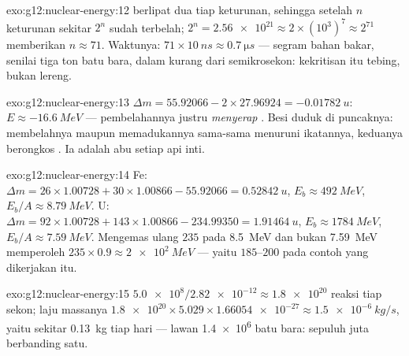 \begin{solution}{exo:g12:nuclear-energy:12}
 berlipat dua tiap keturunan, sehingga setelah $n$ keturunan sekitar $2^n$
sudah terbelah; $2^{n} = \num{2.56e21} \approx 2 \times (10^{3})^{7}
\approx 2^{71}$ memberikan $n \approx 71$. Waktunya: $71 \times \qty{10}{ns}
\approx \qty{0.7}{\micro s}$ --- segram bahan bakar, senilai tiga ton batu bara,
dalam kurang dari semikrosekon: kekritisan itu tebing, bukan lereng.
\end{solution}

\begin{solution}{exo:g12:nuclear-energy:13}
$\Delta m = 55.92066 - 2 \times 27.96924 = \qty{-0.01782}{u}$:
$E \approx \qty{-16.6}{MeV}$ --- pembelahannya justru \emph{menyerap} .
Besi duduk di puncaknya: membelahnya maupun memadukannya sama-sama menuruni
ikatannya, keduanya berongkos . Ia adalah abu setiap api inti.
\end{solution}

\begin{solution}{exo:g12:nuclear-energy:14}
Fe: $\Delta m = 26 \times 1.00728 + 30 \times 1.00866 - 55.92066 =
\qty{0.52842}{u}$, $E_b \approx \qty{492}{MeV}$, $E_b/A \approx
\qty{8.79}{MeV}$. U: $\Delta m = 92 \times 1.00728 + 143 \times
1.00866 - 234.99350 = \qty{1.91464}{u}$, $E_b \approx \qty{1784}{MeV}$,
$E_b/A \approx \qty{7.59}{MeV}$. Mengemas ulang $235$  pada
\qty{8.5}{MeV} dan bukan \qty{7.59}{MeV} memperoleh $235 \times 0.9
\approx \qty{2e2}{MeV}$ --- yaitu $185$--$200$ pada contoh yang dikerjakan itu.
\end{solution}

\begin{solution}{exo:g12:nuclear-energy:15}
$\num{5.0e8}/\num{2.82e-12} \approx \num{1.8e20}$ reaksi tiap
sekon; laju massanya $\num{1.8e20} \times 5.029 \times \num{1.66054e-27}
\approx \qty{1.5e-6}{kg/s}$, yaitu sekitar \qty{0.13}{kg} tiap hari ---
lawan \num{1.4e6}  batu bara: sepuluh juta berbanding satu.
\end{solution}

